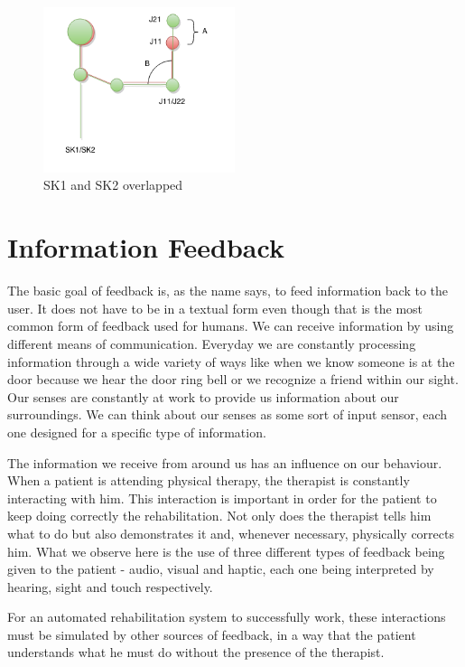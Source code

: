 \begin{figure}[!t]
    \begin{center}
        \includegraphics[width=0.5\textwidth]{imgs/sk1sk2diff}
    \end{center}
	\caption{SK1 and SK2 overlapped}
	\label{fig:sk1sk2diff}
\end{figure}



\section{Information Feedback}
\label{RW-MF}

The basic goal of feedback is, as the name says, to feed information back to the user. 
It does not have to be in a textual form even though that is the most 
common form of feedback used for humans. We can receive information 
by using different means of communication. 
Everyday we are constantly processing information through a wide variety of ways like when 
we know someone is at the door because we hear the door ring bell or we recognize a friend within our sight.
Our senses are constantly at work to provide us information about our surroundings.
We can think about our senses as some sort of input sensor, each one designed for a specific type of information.

The information we receive from around us has an influence on our behaviour.
When a patient is attending physical therapy, the therapist is constantly interacting with him. 
This interaction is important in order for the patient to keep doing correctly the rehabilitation.
Not only does the therapist tells him what to do but also demonstrates it and, whenever necessary, physically corrects him.
What we observe here is the use of three different types of feedback being given to the patient - audio, visual and haptic,
each one being interpreted by hearing, sight and touch respectively.

For an automated rehabilitation system to successfully work, these interactions must 
be simulated by other sources of feedback, in a way that the patient understands 
what he must do without the presence of the therapist.


